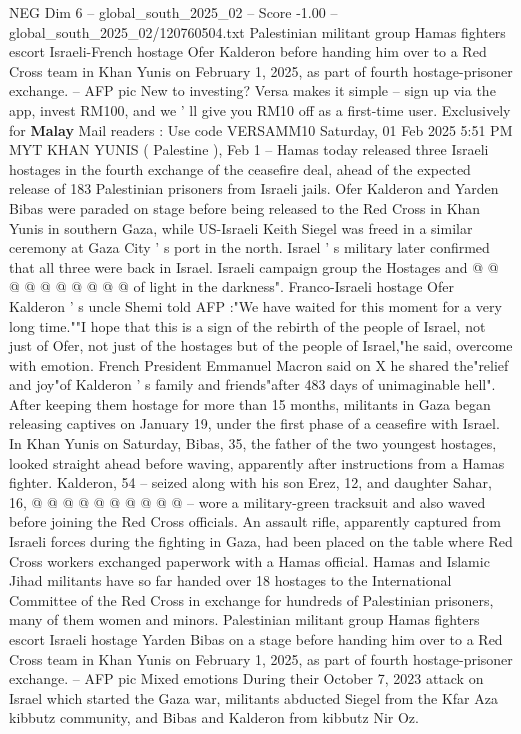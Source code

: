 \begin{textsample}{NEG Dim 6 – global\_south\_2025\_02 – Score -1.00 – global\_south\_2025\_02/120760504.txt}  \label{ex:f6_neg_046}
Palestinian militant group Hamas fighters escort Israeli-French hostage Ofer Kalderon before handing him over to a Red Cross team in Khan Yunis on February 1, 2025, as part of fourth hostage-prisoner exchange. -- AFP pic New to investing?
Versa makes it simple -- sign up via the app, invest RM100, and we ' ll give you RM10 off as a first-time user.
Exclusively for \textbf{Malay} Mail readers : Use code VERSAMM10 Saturday, 01 Feb 2025 5:51 PM MYT KHAN YUNIS ( Palestine ), Feb 1 -- Hamas today released three Israeli hostages in the fourth exchange of the ceasefire deal, ahead of the expected release of 183 Palestinian prisoners from Israeli jails.
Ofer Kalderon and Yarden Bibas were paraded on stage before being released to the Red Cross in Khan Yunis in southern Gaza, while US-Israeli Keith Siegel was freed in a similar ceremony at Gaza City ' s port in the north.
Israel ' s military later confirmed that all three were back in Israel.
Israeli campaign group the Hostages and @ @ @ @ @ @ @ @ @ @ of light in the darkness".
Franco-Israeli hostage Ofer Kalderon ' s uncle Shemi told AFP :"We have waited for this moment for a very long time.""I hope that this is a sign of the rebirth of the people of Israel, not just of Ofer, not just of the hostages but of the people of Israel,"he said, overcome with emotion.
French President Emmanuel Macron said on X he shared the"relief and joy"of Kalderon ' s family and friends"after 483 days of unimaginable hell".
After keeping them hostage for more than 15 months, militants in Gaza began releasing captives on January 19, under the first phase of a ceasefire with Israel.
In Khan Yunis on Saturday, Bibas, 35, the father of the two youngest hostages, looked straight ahead before waving, apparently after instructions from a Hamas fighter.
Kalderon, 54 -- seized along with his son Erez, 12, and daughter Sahar, 16, @ @ @ @ @ @ @ @ @ @ -- wore a military-green tracksuit and also waved before joining the Red Cross officials.
An assault rifle, apparently captured from Israeli forces during the fighting in Gaza, had been placed on the table where Red Cross workers exchanged paperwork with a Hamas official.
Hamas and Islamic Jihad militants have so far handed over 18 hostages to the International Committee of the Red Cross in exchange for hundreds of Palestinian prisoners, many of them women and minors.
Palestinian militant group Hamas fighters escort Israeli hostage Yarden Bibas on a stage before handing him over to a Red Cross team in Khan Yunis on February 1, 2025, as part of fourth hostage-prisoner exchange. -- AFP pic Mixed emotions During their October 7, 2023 attack on Israel which started the Gaza war, militants abducted Siegel from the Kfar Aza kibbutz community, and Bibas and Kalderon from kibbutz Nir Oz.

\end{textsample}
